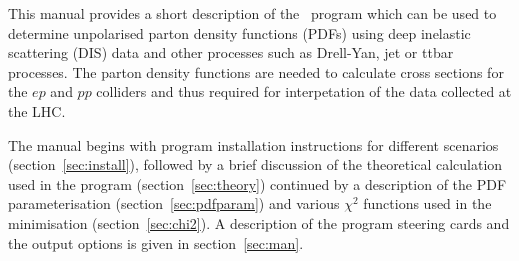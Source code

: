\label{section:introduction}
This manual provides a short description of the \fitter\ program 
which can be used to determine unpolarised parton density functions 
(PDFs) using deep inelastic scattering (DIS) data and other processes such as 
Drell-Yan, jet or ttbar processes.
The parton density functions are needed to calculate cross sections
for the $ep$ and $pp$ colliders and thus required for interpetation
of the data collected at the LHC.

The manual begins with program installation instructions for different scenarios (section~\ref{sec:install}), followed by a brief discussion of the theoretical calculation
used in the program (section~\ref{sec:theory}) continued by a description of the
PDF parameterisation (section~\ref{sec:pdfparam}) and various $\chi^2$ functions used in the
minimisation (section~\ref{sec:chi2}). A description of the program steering cards and
the output options is given in section~\ref{sec:man}.

